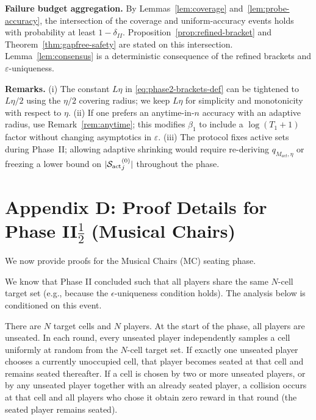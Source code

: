 \noindent\textbf{Failure budget aggregation.}
By Lemmas~\ref{lem:coverage} and~\ref{lem:probe-accuracy}, the intersection of the coverage and uniform-accuracy events holds with probability at least $1-\delta_{II}$. Proposition~\ref{prop:refined-bracket} and Theorem~\ref{thm:gapfree-safety} are stated on this intersection. Lemma~\ref{lem:consensus} is a deterministic consequence of the refined brackets and $\varepsilon$-uniqueness.

\medskip

\noindent\textbf{Remarks.}
(i) The constant $L\eta$ in \eqref{eq:phase2-brackets-def} can be tightened to $L\eta/2$ using the $\eta/2$ covering radius; we keep $L\eta$ for simplicity and monotonicity with respect to $\eta$.
(ii) If one prefers an anytime-in-$n$ accuracy with an adaptive radius, use Remark~\ref{rem:anytime}; this modifies $\beta_1$ to include a $\log(T_1\!+\!1)$ factor without changing asymptotics in $\varepsilon$.
(iii) The protocol fixes active sets during Phase~II; allowing adaptive shrinking would require re-deriving $q_{M_{act},\eta}$ or freezing a lower bound on $|{\mathcal{S}_{\mathrm{act}}}^{(0)}_j|$ throughout the phase.







\bigskip

\section*{Appendix D: Proof Details for Phase II$\tfrac{1}{2}$ (Musical Chairs)}
\label{app:mc}

We now provide proofs for the Musical Chairs (MC) seating phase.

We know that Phase II concluded such that all players share the same $N$-cell target set (e.g., because the $\epsilon$-uniqueness condition holds). The analysis below is conditioned on this event.

There are $N$ target cells and $N$ players. At the start of the phase, all players are unseated.
In each round, every unseated player independently samples a cell uniformly at random from the $N$-cell target set.
If exactly one unseated player chooses a currently unoccupied cell, that player becomes seated at that cell and remains seated thereafter.
If a cell is chosen by two or more unseated players, or by any unseated player together with an already seated player, a collision occurs at that cell and all players who chose it obtain zero reward in that round (the seated player remains seated).

